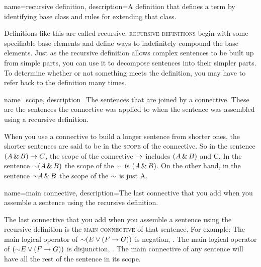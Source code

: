 {
name=recursive definition,
description={A definition that defines a term by identifying base class and rules for extending that class.}
}

Definitions like this are called recursive. \textsc{\Glspl{recursive definition}} \label{def:recursive_definition} begin with some specifiable base elements and define ways to indefinitely compound the base elements. Just as the recursive definition allows complex sentences to be built up from simple parts, you can use it to decompose sentences into their simpler parts. To determine whether or not something meets the definition, you may have to refer back to the definition many times.

{
name=scope,
description={The sentences that are joined by a connective. These are the sentences the connective was applied to when the sentence was assembled using a recursive definition.}
}

When you use a connective to build a longer sentence from shorter ones, the shorter sentences are said to be in the \textsc{\gls{scope}} \label{def:scope} of the connective. So in the sentence $(A \,\&\, B) \rightarrow C$, the scope of the connective $\rightarrow$ includes $(A \,\&\, B)$ and C. In the sentence $\mathord{\sim}(A \,\&\, B)$ the scope of the $\mathord{\sim}$ is $(A \,\&\, B)$. On the other hand, in the sentence $\mathord{\sim} A \,\&\, B$ the scope of the $\mathord{\sim}$ is just A.

{
name=main connective,
description={The last connective that you add when you assemble a sentence using the recursive definition.}
}

The last connective that you add when you assemble a sentence using the recursive definition is the \textsc{\gls{main connective}} \label{def:main_connective} of that sentence. For example: The main logical operator of $\mathord{\sim} (E \vee (F \rightarrow G))$ is negation, \enot. The main logical operator of $(\mathord{\sim} E \vee (F \rightarrow G))$ is disjunction, \eor. The main connective of any sentence will have all the rest of the sentence in its scope.


